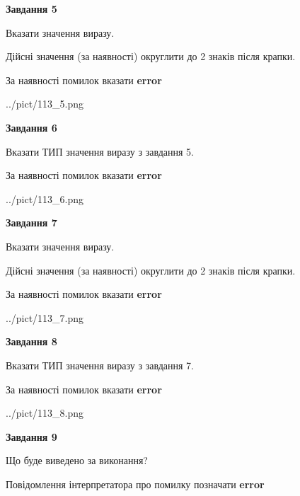 \documentclass[11pt, ukrainian]{article}
\begin{document}
{\begin {large}
{\begin {center}\textbf{Завдання 5}\end {center}}\par
Вказати значення виразу. \par
Дійсні значення (за наявності) округлити до 2 знаків після крапки. \par
За наявності помилок вказати \textbf{error}

\begin{center}
	{../pict/113_5.png}
\end{center}
\newpage

{\begin {center}\textbf{Завдання 6}\end {center}}\par
Вказати ТИП значення виразу з завдання 5. \par
За наявності помилок вказати \textbf{error}

\begin{center}
	{../pict/113_6.png}
\end{center}
\newpage

{\begin {center}\textbf{Завдання 7}\end {center}}\par
Вказати значення виразу. \par
Дійсні значення (за наявності) округлити до 2 знаків після крапки. \par
За наявності помилок вказати \textbf{error}

\begin{center}
	{../pict/113_7.png}
\end{center}
\newpage

{\begin {center}\textbf{Завдання 8}\end {center}}\par
Вказати ТИП значення виразу з завдання 7. \par
За наявності помилок вказати \textbf{error}

\begin{center}
	{../pict/113_8.png}
\end{center}
\newpage

{\begin {center}\textbf{Завдання 9}\end {center}}\par
Що буде виведено за виконання? \par
Повідомлення інтерпретатора про помилку позначати \textbf{error}


\end{large}}
\end{document}
